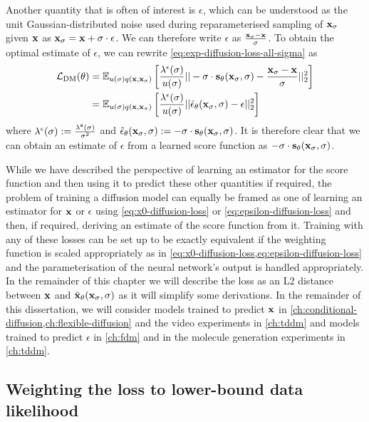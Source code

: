 Another quantity that is often of interest is $\epsilon$, which can be understood as the unit Gaussian-distributed noise used during reparameterised sampling of ${\mathbf{x}}_\sigma$ given ${\mathbf{x}}$ as ${\mathbf{x}}_\sigma = {\mathbf{x}} + \sigma \cdot \epsilon$. We can therefore write $\epsilon$ as $\frac{{\mathbf{x}}_\sigma-{\mathbf{x}}}{\sigma}$. To obtain the optimal estimate of $\epsilon$, we can rewrite \cref{eq:exp-diffusion-loss-all-sigma} as
\begin{align} \label{eq:epsilon-diffusion-loss}
    \mathcal{L}_\text{DM}(\theta) &= \mathbb{E}_{u(\sigma)q({\mathbf{x}}, {\mathbf{x}}_\sigma)} \left[ 
    \frac{\lambda^\epsilon(\sigma)}{u(\sigma)} || -\sigma \cdot {\mathbf{s}}_\theta({\mathbf{x}}_\sigma, \sigma) - \frac{{\mathbf{x}}_\sigma-{\mathbf{x}}}{\sigma} ||_2^2 \right] \\
    &= \mathbb{E}_{u(\sigma)q({\mathbf{x}}, {\mathbf{x}}_\sigma)} \left[ 
    \frac{\lambda^\epsilon(\sigma)}{u(\sigma)} || \hat{\mathbf{\epsilon}}_\theta({\mathbf{x}}_\sigma, \sigma) - \epsilon ||_2^2 \right]
\end{align}
where $\lambda^\epsilon(\sigma) := \frac{\lambda^{\mathbf{s}}(\sigma)}{\sigma^2}$ and $\hat{\mathbf{\epsilon}}_\theta({\mathbf{x}}_\sigma, \sigma) := -\sigma \cdot {\mathbf{s}}_\theta({\mathbf{x}}_\sigma, \sigma)$. It is therefore clear that we can obtain an estimate of $\epsilon$ from a learned score function as $-\sigma \cdot {\mathbf{s}}_\theta({\mathbf{x}}_\sigma, \sigma)$.

While we have described the perspective of learning an estimator for the score function and then using it to predict these other quantities if required, the problem of training a diffusion model can equally be framed as one of learning an estimator for ${\mathbf{x}}$ or $\epsilon$ using \cref{eq:x0-diffusion-loss} or \cref{eq:epsilon-diffusion-loss} and then, if required, deriving an estimate of the score function from it. Training with any of these losses can be set up to be exactly equivalent if the weighting function is scaled appropriately as in \cref{eq:x0-diffusion-loss,eq:epsilon-diffusion-loss} and the parameterisation of the neural network's output is handled appropriately. In the remainder of this chapter we will describe the loss as an L2 distance between ${\mathbf{x}}$ and $\hat{{\mathbf{x}}}_\theta({\mathbf{x}}_\sigma, \sigma)$ as it will simplify some derivations. In the remainder of this dissertation, we will consider models trained to predict ${\mathbf{x}}$ in \cref{ch:conditional-diffusion,ch:flexible-diffusion} and the video experiments in \cref{ch:tddm} and models trained to predict $\epsilon$ in \cref{ch:fdm} and in the molecule generation experiments in \cref{ch:tddm}.

\subsection{Weighting the loss to lower-bound data likelihood} \label{sec:diffusion-likelihood}

